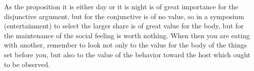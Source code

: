 As the proposition it  is either day or it is night is  of great importance for
the disjunctive  argument, but  for the  conjunctive is  of no  value, so  in a
symposium (entertainment) to select the larger  share is of great value for the
body, but for the maintenance of the social feeling is worth nothing. When then
you are  eating with another, remember  to look not  only to the value  for the
body of the things set before you, but also to the value of the behavior toward
the host which ought to be observed.
